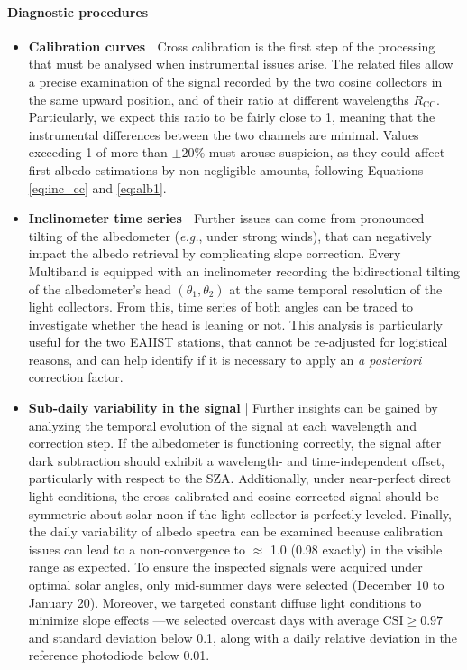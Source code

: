 \documentclass[11pt,a4paper]{article}
\newcommand{\eg}{\emph{e.g.}, }
\begin{document}
				\paragraph{Diagnostic procedures}
	
\begin{itemize}[align=right,itemindent=2em,labelsep=4pt,labelwidth=1em,leftmargin=0pt,nosep]
	\item \textbf{Calibration curves} |
	Cross calibration is the first step of the processing that must be analysed when instrumental issues arise. The related files allow a precise examination of the signal recorded by the two cosine collectors in the same upward position, and of their ratio at different wavelengths $R_\mathrm{CC}$. Particularly, we expect this ratio to be fairly close to 1, meaning that the instrumental differences between the two channels are minimal. Values exceeding 1 of more than $\pm20\%$ must arouse suspicion, as they could affect first albedo estimations by non-negligible amounts, following Equations \eqref{eq:inc_cc} and  \eqref{eq:alb1}. 
	
	\item \textbf{Inclinometer time series} |
	Further issues can come from pronounced tilting of the albedometer (\eg under strong winds), that can negatively impact the albedo retrieval by complicating slope correction. Every Multiband is equipped with an inclinometer recording the bidirectional tilting of the albedometer's head $(\theta_1, \theta_2)$ at the same temporal resolution of the light collectors. From this, time series of both angles can be traced to investigate whether the head is leaning or not. This analysis is particularly useful for the two EAIIST stations, that cannot be re-adjusted for logistical reasons, and can help identify if it is necessary to apply an \emph{a posteriori} correction factor.
	
	\item \textbf{Sub-daily variability in the signal} |
	Further insights can be gained by analyzing the temporal evolution of the signal at each wavelength and correction step. If the albedometer is functioning correctly, the signal after dark subtraction should exhibit a wavelength- and time-independent offset, particularly with respect to the SZA. Additionally, under near-perfect direct light conditions, the cross-calibrated and cosine-corrected signal should be symmetric about solar noon if the light collector is perfectly leveled. Finally, the daily variability of albedo spectra can be examined because calibration issues can lead to a non-convergence to $\approx$ 1.0 (0.98 exactly) in the visible range as expected. To ensure the inspected signals were acquired under optimal solar angles, only mid-summer days were selected (December 10 to January 20). Moreover, we targeted constant diffuse light conditions to minimize slope effects \parencite{picardSpectralAlbedoMeasurements2020}---we selected overcast days with average $\mathrm{CSI} \geq 0.97$ and standard deviation below 0.1, along with a daily relative deviation in the reference photodiode below 0.01.
\end{itemize}
	
\end{document}
